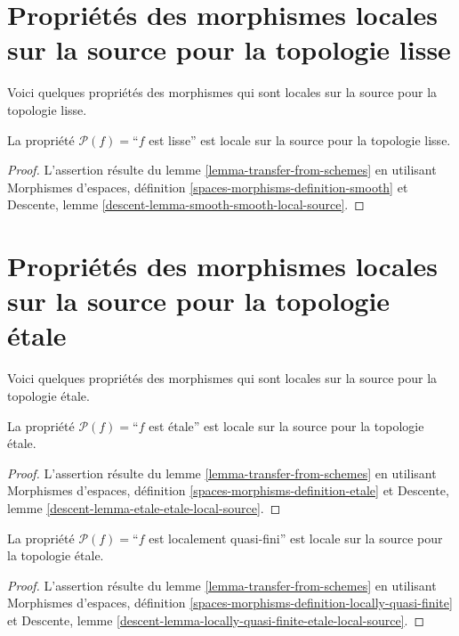 \section{Propriétés des morphismes locales sur la source pour la topologie lisse}
\label{section-smooth-local-source}

\noindent
Voici quelques propriétés des morphismes qui sont locales sur la source pour la topologie lisse.

\begin{lemma}
\label{lemma-smooth-smooth-local-source}
La propriété $\mathcal{P}(f)=$``$f$ est lisse''
est locale sur la source pour la topologie lisse.
\end{lemma}

\begin{proof}
L'assertion résulte du
lemme \ref{lemma-transfer-from-schemes}
en utilisant
Morphismes d'espaces, définition \ref{spaces-morphisms-definition-smooth}
et
Descente, lemme \ref{descent-lemma-smooth-smooth-local-source}.
\end{proof}



\section{Propriétés des morphismes locales sur la source pour la topologie \'etale}
\label{section-etale-local-source}

\noindent
Voici quelques propriétés des morphismes qui sont locales sur la source pour la topologie \'etale.

\begin{lemma}
\label{lemma-etale-etale-local-source}
La propriété $\mathcal{P}(f)=$``$f$ est \'etale''
est locale sur la source pour la topologie \'etale.
\end{lemma}

\begin{proof}
L'assertion résulte du
lemme \ref{lemma-transfer-from-schemes}
en utilisant
Morphismes d'espaces,
définition \ref{spaces-morphisms-definition-etale}
et
Descente, lemme \ref{descent-lemma-etale-etale-local-source}.
\end{proof}

\begin{lemma}
\label{lemma-locally-quasi-finite-etale-local-source}
La propriété $\mathcal{P}(f)=$``$f$ est localement quasi-fini''
est locale sur la source pour la topologie \'etale.
\end{lemma}

\begin{proof}
L'assertion résulte du
lemme \ref{lemma-transfer-from-schemes}
en utilisant
Morphismes d'espaces,
définition \ref{spaces-morphisms-definition-locally-quasi-finite}
et
Descente, lemme \ref{descent-lemma-locally-quasi-finite-etale-local-source}.
\end{proof}


